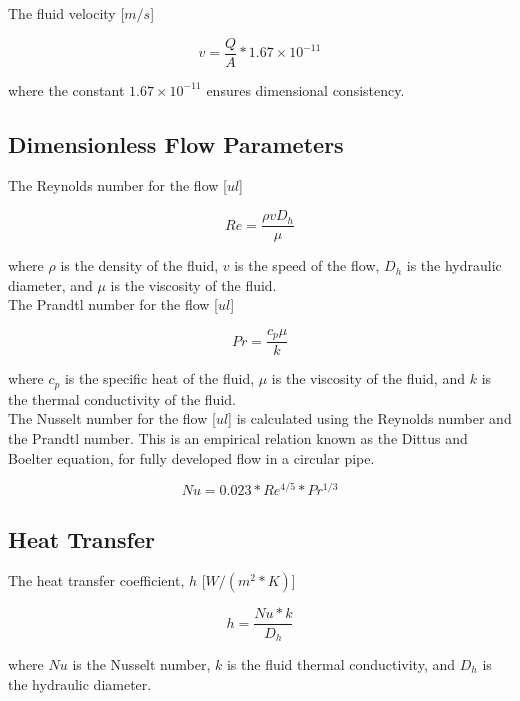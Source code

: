 \documentclass{article}
\begin{document}
The fluid velocity [$m/s$]

\begin{equation}
	v = \frac{Q}{A} * 1.67 \times 10^{-11}
\end{equation}

where the constant $1.67 \times 10^{-11}$ ensures dimensional consistency.

\subsection{Dimensionless Flow Parameters}

The Reynolds number for the flow [$ul$]

\begin{equation}
	Re = \frac{ \rho v D_h }{ \mu }
\end{equation}

where $\rho$ is the density of the fluid, $v$ is the speed of the flow, $D_h$ is the hydraulic diameter, and $\mu$ is the viscosity of the fluid. \\

The Prandtl number for the flow [$ul$]

\begin{equation}
	Pr = \frac{c_p\mu}{k}
\end{equation}

where $c_p$ is the specific heat of the fluid, $\mu$ is the viscosity of the fluid, and $k$ is the thermal conductivity of the fluid. \\

The Nusselt number for the flow [$ul$] is calculated using the Reynolds number and the Prandtl number. This is an empirical relation known as the Dittus and Boelter equation, for fully developed flow in a circular pipe.

\begin{equation}
	Nu = 0.023 * Re^{4/5} * Pr^{1/3}
\end{equation}

\subsection{Heat Transfer}

The heat transfer coefficient, $h$ [$W/(m^2*K)$]

\begin{equation}
	h = \frac{Nu*k}{D_h}
\end{equation}

where $Nu$ is the Nusselt number, $k$ is the fluid thermal conductivity, and $D_h$ is the hydraulic diameter. \\
\end{document}
